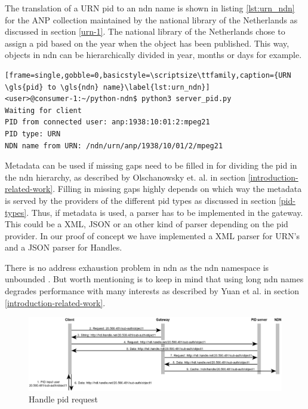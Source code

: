 The translation of a URN \gls{pid} to an \gls{ndn} name is shown in listing \ref{lst:urn_ndn} for the ANP collection maintained by the national library of the Netherlands as discussed in section \ref{urn-1}. The national library of the Netherlands chose to assign a \gls{pid} based on the year when the object has been published. 
This way, objects in \gls{ndn} can be hierarchically divided in year, months or days for example.
\vspace{1em}
\begin{lstlisting}[frame=single,gobble=0,basicstyle=\scriptsize\ttfamily,caption={URN \gls{pid} to \gls{ndn} name}\label{lst:urn_ndn}]
<user>@consumer-1:~/python-ndn$ python3 server_pid.py
Waiting for client
PID from connected user: anp:1938:10:01:2:mpeg21
PID type: URN
NDN name from URN: /ndn/urn/anp/1938/10/01/2/mpeg21
\end{lstlisting}

Metadata can be used if missing gaps need to be filled in for dividing the \gls{pid} in the \gls{ndn} hierarchy, as described by Olschanowsky et. al. \cite{ndn-clim} in section \ref{introduction-related-work}. 
Filling in missing gaps highly depends on which way the metadata is served by the providers of the different \gls{pid} types as discussed in section \ref{pid-types}. Thus, if metadata is used, a parser has to be implemented in the gateway. This could be a XML, JSON or an other kind of parser depending on the \gls{pid} provider. In our proof of concept we have implemented a XML parser for URN's and a JSON parser for Handles.

There is no address exhaustion problem in \gls{ndn} as the \gls{ndn} namespace is unbounded \cite{ndn-nspace}. But worth mentioning is to keep in mind that using long \gls{ndn} names degrades performance with many interests as described by Yuan et al. \cite{yuan2012scalable} in section \ref{introduction-related-work}.

\begin{figure}[H]
    \centering
    \includegraphics[width=\textwidth]{Images/pid_seq5.png}
    \caption{Handle \gls{pid} request\label{fig:seq_pid}}
\end{figure}

